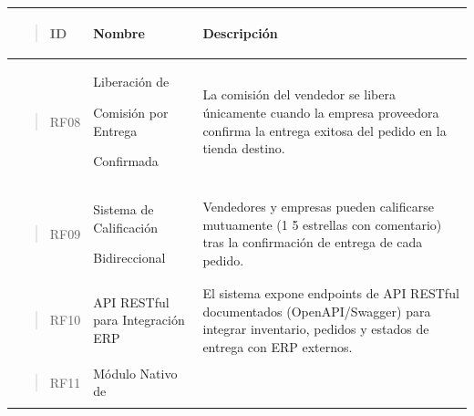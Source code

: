 \documentclass[
]{article}
\newcounter{none} %
\begin{document}
{\def\LTcaptype{none} %
\begin{longtable}[]{@{}
  >{\raggedright\arraybackslash}p{}
  >{\raggedright\arraybackslash}p{}
  >{\raggedright\arraybackslash}p{}@{}}
\toprule\noalign{}
\begin{minipage}[b]{\linewidth}\raggedright
\begin{quote}
ID
\end{quote}
\end{minipage} & \begin{minipage}[b]{\linewidth}\raggedright
Nombre
\end{minipage} & \begin{minipage}[b]{\linewidth}\raggedright
Descripción
\end{minipage} \\
\midrule\noalign{}
\endhead
\bottomrule\noalign{}
\endlastfoot
\begin{minipage}[t]{\linewidth}\raggedright
\begin{quote}
RF08
\end{quote}
\end{minipage} & Liberación de

Comisión por Entrega

Confirmada & La comisión del vendedor se libera únicamente cuando la
empresa proveedora confirma la entrega exitosa del pedido en la tienda
destino. \\
\begin{minipage}[t]{\linewidth}\raggedright
\begin{quote}
RF09
\end{quote}
\end{minipage} & Sistema de Calificación

Bidireccional & Vendedores y empresas pueden calificarse mutuamente (1 5
estrellas con comentario) tras la confirmación de entrega de cada
pedido. \\
\begin{minipage}[t]{\linewidth}\raggedright
\begin{quote}
RF10
\end{quote}
\end{minipage} & API RESTful para Integración ERP & El sistema expone
endpoints de API RESTful documentados (OpenAPI/Swagger) para integrar
inventario, pedidos y estados de entrega con ERP externos. \\
\begin{minipage}[t]{\linewidth}\raggedright
\begin{quote}
RF11
\end{quote}
\end{minipage} & Módulo Nativo de


\end{longtable}}
\end{document}
